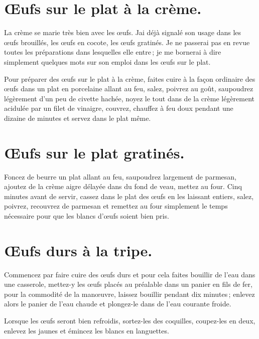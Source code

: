 \section*{\centering Œufs sur le plat à la crème.}

La crème se marie très bien avec les œufs. Jai déjà signalé son usage dans les
œufs brouillés, les œufs en cocote, les œufs gratinés. Je ne passerai pas en
revue toutes les préparations dans lesquelles elle entre ; je me bornerai
à dire simplement quelques mots sur son emploi dans les œufs sur le plat.

Pour préparer des œufs sur le plat à la crème, faites cuire à la façon
ordinaire des œufs dans un plat en porcelaine allant au feu, salez, poivrez au
goût, saupoudrez légèrement d'un peu de civette hachée, noyez le tout dans de
la crème légèrement acidulée par un filet de vinaigre, couvrez, chauffez à feu
doux pendant une dizaine de minutes et servez dans le plat même.

\section*{\centering Œufs sur le plat gratinés.}

Foncez de beurre un plat allant au feu, saupoudrez largement de parmesan,
ajoutez de la crème aigre délayée dans du fond de veau, mettez au four. Cinq
minutes avant de servir, cassez dans le plat des œufs en les laissant entiers,
salez, poivrez, recouvrez de parmesan et remettez au four simplement le temps
nécessaire pour que les blancs d'œufs soient bien pris.

\section*{\centering Œufs durs à la tripe.}

Commencez par faire cuire des œufs durs et pour cela faites bouillir de l’eau
dans une casserole, mettez-y les œufs placés au préalable dans un panier en
fils de fer, pour la commodité de la manœuvre, laissez bouillir pendant dix
minutes ; enlevez alors le panier de l’eau chaude et plongez-le dans de l'eau
courante froide.

Lorsque les œufs seront bien refroidis, sortez-les des coquilles, coupez-les en
deux, enlevez les jaunes et émincez les blancs en languettes.

